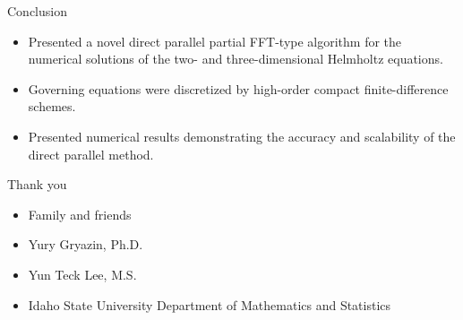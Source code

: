 \documentclass[handout]{beamer}
\begin{document}
\begin{frame}{Conclusion}
\begin{itemize}
\item Presented a novel direct parallel partial FFT-type algorithm for the numerical solutions of the two- and three-dimensional Helmholtz equations.\\[1em]
\item Governing equations were discretized by high-order compact finite-difference schemes.\\[1em]
\item Presented numerical results demonstrating the accuracy and scalability of the direct parallel method.\\[1em]
\end{itemize}
\end{frame}


\begin{frame}{Thank you}
\begin{itemize}
\item Family and friends\\[1em]
\item Yury Gryazin,  Ph.D.\\[1em]
\item Yun Teck Lee, M.S.\\[1em]
\item Idaho State University Department of Mathematics and Statistics\\[1em]
\end{itemize}
\end{frame}
\end{document}

